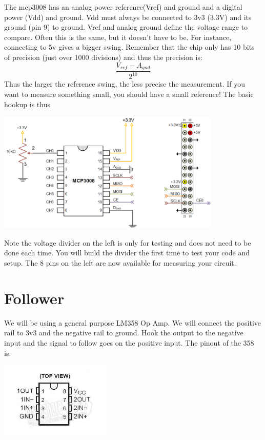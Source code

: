 

The mcp3008 has an analog power reference(Vref) and ground and a digital power (Vdd) and ground.  Vdd must always be connected to 3v3 (3.3V) and its ground (pin 9) to ground.  Vref and analog ground define the voltage range to compare.  Often this is the same, but it doesn't have to be.  For instance, connecting to 5v gives a bigger swing.  Remember that the chip only has 10 bits of precision (just over 1000 divisions) and thus the precision is:
$$
\frac{V_{ref}-A_{gnd}}{2^{10}}
$$
Thus the larger the reference swing, the less precise the measurement.  If you want to measure something small, you should have a small reference!  The basic hookup is thus

\includegraphics[width=0.8\textwidth]{../images/mcp3008_circuit.png}

Note the voltage divider on the left is only for testing and does not need to be done each time.  You will build the divider the first time to test your code and setup.  The 8 pins on the left are now available for measuring your circuit.

\section{Follower}

We will be using a general purpose LM358 Op Amp.  We will connect the positive rail to 3v3 and the negative rail to ground.  Hook the output to the negative input and the signal to follow goes on the positive input.  The pinout of the 358 is:

\includegraphics[width=0.4\textwidth]{../images/lm358.jpg}

